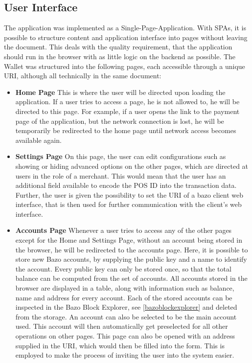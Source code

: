 \subsection{User Interface}\label{userinterface}
The application was implemented as a Single-Page-Application. With SPAs, it is possible to structure content and application interface into pages without leaving the document. %
This deals with the quality requirement, that the application should run in the browser with as little logic on the backend as possible. The Wallet was structured into the following pages, each accessible through a unique URI, although all technically in the same document:
\begin{itemize}
\item \textbf{Home Page}
This is where the user will be directed upon loading the application. If a user tries to access a page, he is not allowed to, he will be directed to this page. For example, if a user opens the link to the payment page of the application, but the network connection is lost, he will be temporarily be redirected to the home page until network access becomes available again.
\item \textbf{Settings Page}
On this page, the user can edit configurations such as showing or hiding advanced options on the other pages, which are directed at users in the role of a merchant. This would mean that the user has an additional field available to encode the POS ID into the transaction data. Further, the user is given the possibility to set the URI of a bazo client web interface, that is then used for further communication with the client's web interface.
\item \textbf{Accounts Page}
Whenever a user tries to access any of the other pages except for the Home and Settings Page, without an account being stored in the browser, he will be redirected to the accounts page. Here, it is possible to store new Bazo accounts, by supplying the public key and a name to identify the account. Every public key can only be stored once, so that the total balance can be computed from the set of accounts. All accounts stored in the browser are displayed in a table, along with information such as balance, name and address for every account. Each of the stored accounts can be inspected in the Bazo Block Explorer, see \ref{bazoblockexplorer} and deleted from the storage. An account can also be selected to be the main account used. This account will then automatically get preselected for all other operations on other pages.
This page can also be opened with an address supplied in the URI, which would then be filled into the form. This is employed to make the process of inviting the user into the system easier.

\end{itemize}
